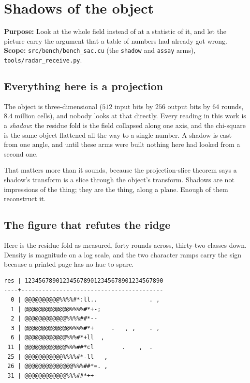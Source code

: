 \chapter{Shadows of the object}

\textbf{Purpose:} Look at the whole field instead of at a statistic of it, and let the picture
carry the argument that a table of numbers had already got wrong. \textbf{Scope:}
\texttt{src/\allowbreak{}bench/\allowbreak{}bench\_\allowbreak{}sac.\allowbreak{}cu} (the
\texttt{shadow} and \texttt{assay} arms), \texttt{tools/\allowbreak{}radar\_\allowbreak{}receive.py}.

\section{Everything here is a projection}

The object is three-dimensional (\(512\) input bits by \(256\) output bits by \(64\) rounds,
\(8.4\) million cells), and nobody looks at that directly. Every reading in this work is a
\emph{shadow}: the residue fold is the field collapsed along one axis, and the chi-square is the
same object flattened all the way to a single number. A shadow is cast from one angle, and until
these arms were built nothing here had looked from a second one.

That matters more than it sounds, because the projection-slice theorem says a shadow's transform is
a slice through the object's transform. Shadows are not impressions of the thing; they are the
thing, along a plane. Enough of them reconstruct it.

\section{The figure that refutes the ridge}

Here is the residue fold as measured, forty rounds across, thirty-two classes down. Density is
magnitude on a log scale, and the two character ramps carry the sign because a printed page has no
hue to spare.

\begin{verbatim}
res | 1234567890123456789012345678901234567890
----+-----------------------------------------
  0 | @@@@@@@@@@%%%%#*:ll..               . ,
  1 | @@@@@@@@@@@@@%%%%#*+-;
  2 | @@@@@@@@@@@@%%%%##*--
  3 | @@@@@@@@@@@@@%%%%#*+     .   , ,    . ,
  6 | @@@@@@@@@@@@%%%#*+ll  ,
 11 | @@@@@@@@@@@@%%%##*cl        .    ,  .
 25 | @@@@@@@@@@@%%%%#*-ll   ,
 26 | @@@@@@@@@@@@@@%%%##*=. ,
 31 | @@@@@@@@@@@@%%%##*++-
\end{verbatim}

